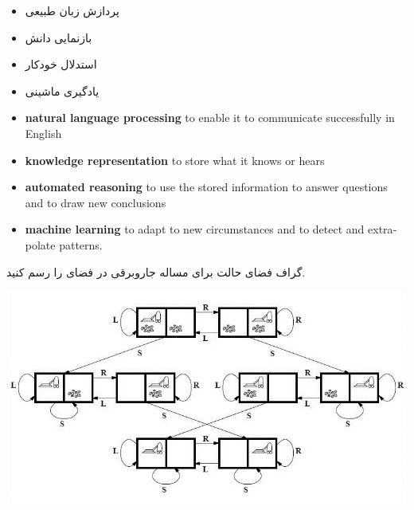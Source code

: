 \documentclass[12pt]{article}
\begin{document}
\begin{tcolorbox}
\begin{itemize}
	\item پردازش زبان طبیعی 
	\item بازنمایی دانش 
	\item استدلال خودکار 
	\item یادگیری ماشینی 
\end{itemize}
\end{tcolorbox}


\begin{latin}
\begin{tcolorbox}
\begin{itemize}
	\item \textbf{natural language processing} to enable it to communicate successfully in English
	\item \textbf{knowledge representation} to store what it knows or hears
	\item \textbf{automated reasoning} to use the stored information to answer questions and to draw
new conclusions
	\item \textbf{machine learning} to adapt to new circumstances and to detect and extrapolate patterns.
\end{itemize}
\end{tcolorbox}
\end{latin}





\newpage
\vspace{20pt}
\noindent
گراف فضای حالت برای مساله جاروبرقی در فضای
 را رسم کنید.



\begin{center}
	\includegraphics[scale=0.8]{./The-state-space-of-the-Vacuum-World-domain.jpg}
\end{center}
\end{document}
